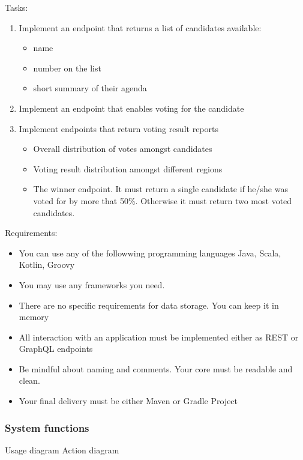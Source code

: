 \documentclass[12pt,a4paper]{article}
\begin{document}
Tasks:
\begin{enumerate}
    \item
        Implement an endpoint that returns a list of candidates available:
        \begin{itemize}
            \item name
            \item number on the list
            \item short summary of their agenda
        \end{itemize}
    \item
        Implement an endpoint that enables voting for the candidate
    \item
        Implement endpoints that return voting result reports
        \begin{itemize}
            \item Overall distribution of votes amongst candidates
            \item Voting result distribution amongst different regions
            \item The winner endpoint. It must return a single candidate
                if he/she was voted for by more that 50\%. Otherwise
                it must return two most voted candidates.
        \end{itemize}
\end{enumerate}

Requirements:
\begin{itemize}
    \item
        You can use any of the followwing programming languages Java, Scala, Kotlin, Groovy
    \item
        You may use any frameworks you need.
    \item
        There are no specific requirements for data storage. You can keep it in
        memory
    \item
        All interaction with an application must be implemented either as REST
        or GraphQL endpoints
    \item
        Be mindful about naming and comments. Your core must be readable and
        clean.
    \item
        Your final delivery must be either Maven or Gradle Project
\end{itemize}

\subsubsection{System functions}
Usage diagram
Action diagram
\end{document}
